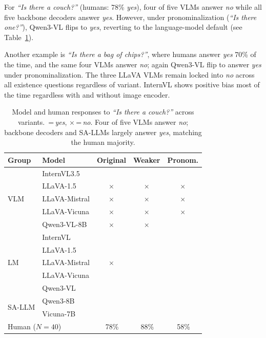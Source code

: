 \documentclass[letterpaper]{article} %
\begin{document}
For \textit{``Is there a couch?''} (humans: 78\% \textit{yes}), four of five VLMs answer \textit{no} while all five backbone decoders answer \textit{yes}. However, under pronominalization (\textit{``Is there one?''}), Qwen3-VL flips to \textit{yes}, reverting to the language-model default (see Table~\ref{tab:existence_couch}).

Another example is \textit{``Is there a bag of chips?''}, where humans answer \textit{yes} 70\% of the time, and the same four VLMs answer \textit{no}; again Qwen3-VL flip to answer \textit{yes} under pronominalization.
The three LLaVA VLMs remain locked into \textit{no} across all existence questions regardless of variant. InternVL shows positive bias most of the time regardless with and without image encoder.

\newcommand{\cyes}{\cellcolor{green!15}\checkmark}
\newcommand{\cno}{\cellcolor{red!15}$\times$}
\begin{table}[h]
\centering\small\setlength{\tabcolsep}{5pt}
\begin{tabular}{llccc}
\toprule
\textbf{Group} & \textbf{Model} & \textbf{Original} & \textbf{Weaker} & \textbf{Pronom.} \\
\midrule
\midrule
\multirow{5}{*}{VLM} & InternVL3.5 & \cyes & \cyes & \cyes \\
 & LLaVA-1.5 & \cno & \cno & \cno \\
 & LLaVA-Mistral & \cno & \cno & \cno \\
 & LLaVA-Vicuna & \cno & \cno & \cno \\
 & Qwen3-VL-8B & \cno & \cno & \cyes \\
\midrule
\multirow{5}{*}{LM} & InternVL & \cyes & \cyes & \cyes \\
 & LLaVA-1.5 & \cyes & \cyes & \cyes \\
 & LLaVA-Mistral & \cno & \cyes & \cyes \\
 & LLaVA-Vicuna & \cyes & \cyes & \cyes \\
 & Qwen3-VL & \cyes & \cyes & \cyes \\
\midrule
\multirow{2}{*}{SA-LLM} & Qwen3-8B & \cyes & \cyes & \cyes \\
 & Vicuna-7B & \cyes & \cyes & \cyes \\
\midrule
\multicolumn{2}{l}{Human ($N{=}40$)} & \cyes\,78\% & \cyes\,88\% & \cyes\,58\% \\
\bottomrule
\end{tabular}
\caption{Model and human responses to \textit{``Is there a couch?''} across variants. \checkmark\,=\,\textit{yes}, $\times$\,=\,\textit{no}. Four of five VLMs answer \textit{no}; backbone decoders and SA-LLMs largely answer \textit{yes}, matching the human majority.}
\label{tab:existence_couch}
\end{table}
\end{document}
